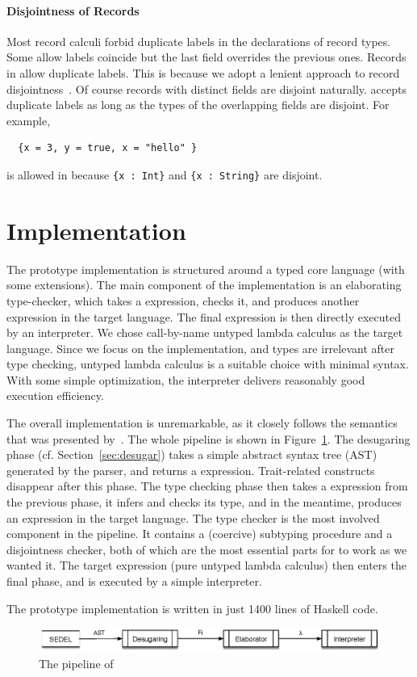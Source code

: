 \paragraph{Disjointness of Records}

Most record calculi forbid duplicate labels in the declarations of record types.
Some allow labels coincide but the last field overrides the previous ones.
Records in \name allow duplicate labels. This is because we adopt a lenient
approach to record disjointness~\cite{alpuimdisjoint}. Of course records with
distinct fields are disjoint naturally. \name accepts duplicate labels as long
as the types of the overlapping fields are disjoint. For example,
\begin{lstlisting}
  {x = 3, y = true, x = "hello" }
\end{lstlisting}
is allowed in \name because \lstinline${x : Int}$ and \lstinline${x : String}$ are
disjoint.

\section{Implementation}

The \name prototype implementation is structured around a typed core language
(\bname with some extensions). The main component of the implementation is an
elaborating type-checker, which takes a \bname expression, checks it, and
produces another expression in the target language. The final expression is then
directly executed by an interpreter. We chose call-by-name untyped lambda
calculus as the target language. Since we focus on the implementation, and types
are irrelevant after type checking, untyped lambda calculus is a suitable choice
with minimal syntax. With some simple optimization, the interpreter delivers
reasonably good execution efficiency.

The overall implementation is unremarkable, as it closely follows the semantics
that was presented by~\citet{alpuimdisjoint}. The whole pipeline is shown in
Figure~\ref{fig:pipeline}. The desugaring phase (cf. Section~\ref{sec:desugar})
takes a simple abstract syntax tree (AST) generated by the parser, and returns a
\bname expression. Trait-related constructs disappear after this phase. The
type checking phase then takes a \bname expression from the previous phase, it
infers and checks its type, and in the meantime, produces an expression in the
target language. The type checker is the most involved component in the
pipeline. It contains a (coercive) subtyping procedure and a disjointness
checker, both of which are the most essential parts for \name to work as we
wanted it. The target expression (pure untyped lambda calculus) then enters the
final phase, and is executed by a simple interpreter.

The prototype implementation is written in just 1400 lines of Haskell code.

\begin{figure}
  \centering
  \includegraphics[scale=0.9]{pipeline.eps}
  \caption{The pipeline of \name}
  \label{fig:pipeline}
\end{figure}